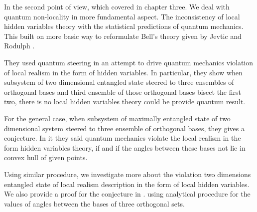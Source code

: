


In the second point of view, which covered in chapter three. We deal with quantum non-locality  in more fundamental aspect. The inconsistency of local hidden variables theory with the statistical predictions of quantum mechanics.
This built on more basic way to reformulate Bell's theory given by  Jevtic and Rodulph \citep*{Jevtic:2015:10.1364/JOSAB.32.000A50}. 

They used quantum steering  in an attempt to drive  quantum mechanics  violation of local realism in the form of hidden variables. 
In particular, they show when  subsystem of two dimensional entangled state steered to three ensembles of orthogonal  bases and third  ensemble of those orthogonal bases bisect the first two, there is no local hidden variables theory could be provide quantum result.

For the general case, when subsystem of maximally entangled state of two dimensional system steered to three ensemble of orthogonal bases, they gives a conjecture. In it they said quantum mechanics violate the local realism in the form hidden variables theory, if and if the angles between these bases not lie in convex hull of given points. 

Using similar procedure, we investigate more about the violation two dimensions entangled state of local realism description in the form of local hidden variables. We also  provide a proof for the  conjecture in \citep*{Jevtic:2015:10.1364/JOSAB.32.000A50}. using analytical procedure for the values of angles between the bases of three orthogonal sets. 

